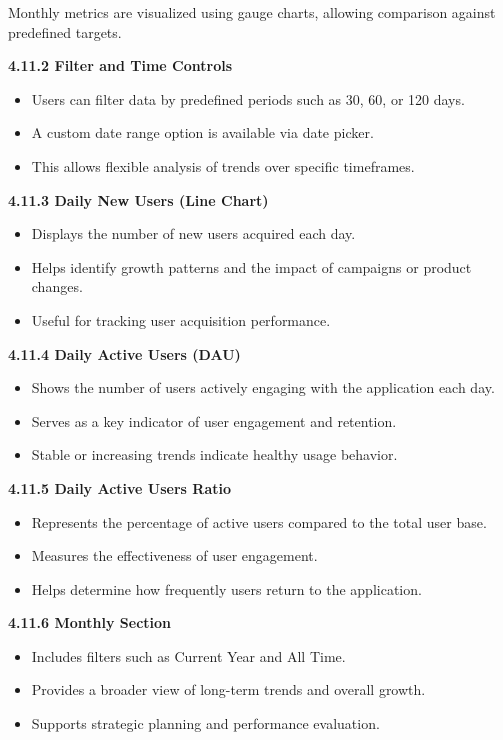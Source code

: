 Monthly metrics are visualized using gauge charts, allowing comparison
against predefined targets.

\textbf{4.11.2 Filter and Time Controls}

\begin{itemize}
\item
  Users can filter data by predefined periods such as 30, 60, or 120
  days.
\item
  A custom date range option is available via date picker.
\item
  This allows flexible analysis of trends over specific timeframes.
\end{itemize}

\textbf{4.11.3 Daily New Users (Line Chart)}

\begin{itemize}
\item
  Displays the number of new users acquired each day.
\item
  Helps identify growth patterns and the impact of campaigns or product
  changes.
\item
  Useful for tracking user acquisition performance.
\end{itemize}

\textbf{4.11.4 Daily Active Users (DAU)}

\begin{itemize}
\item
  Shows the number of users actively engaging with the application each
  day.
\item
  Serves as a key indicator of user engagement and retention.
\item
  Stable or increasing trends indicate healthy usage behavior.
\end{itemize}

\textbf{4.11.5 Daily Active Users Ratio}

\begin{itemize}
\item
  Represents the percentage of active users compared to the total user
  base.
\item
  Measures the effectiveness of user engagement.
\item
  Helps determine how frequently users return to the application.
\end{itemize}

\textbf{4.11.6 Monthly Section}

\begin{itemize}
\item
  Includes filters such as Current Year and All Time.
\item
  Provides a broader view of long-term trends and overall growth.
\item
  Supports strategic planning and performance evaluation.
\end{itemize}

